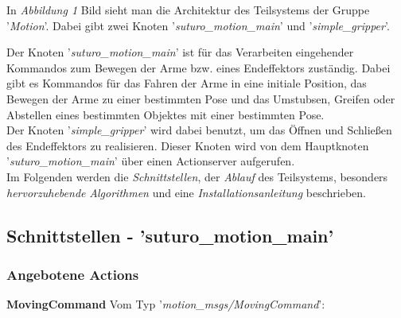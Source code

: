 \documentclass{suturo}
\begin{document}
In \textit{Abbildung 1} Bild sieht man die Architektur des Teilsystems der Gruppe '\textit{Motion}'. Dabei gibt zwei Knoten '\textit{suturo\_motion\_main}' und '\textit{simple\_gripper}'.\\

\begin{figure}[!htb]
\end{figure}

Der Knoten '\textit{suturo\_motion\_main}' ist für das Verarbeiten eingehender Kommandos zum Bewegen der Arme bzw. eines Endeffektors zuständig. Dabei gibt es Kommandos für das Fahren der Arme in eine initiale Position, das Bewegen der Arme zu einer bestimmten Pose und das Umstubsen, Greifen oder Abstellen eines bestimmten Objektes mit einer bestimmten Pose.\\
Der Knoten '\textit{simple\_gripper}' wird dabei benutzt, um das Öffnen und Schließen des Endeffektors zu realisieren. Dieser Knoten wird von dem Hauptknoten '\textit{suturo\_motion\_main}' über einen Actionserver aufgerufen.\\

Im Folgenden werden die \textit{Schnittstellen}, der \textit{Ablauf} des Teilsystems, besonders \textit{hervorzuhebende} \textit{Algorithmen} und eine \textit{Installationsanleitung} beschrieben.\\

\subsection{Schnittstellen - 'suturo\_motion\_main'}
\subsubsection{Angebotene Actions}
\textbf{MovingCommand}
Vom Typ '\textit{motion\_msgs/MovingCommand}': \\
\end{document}

